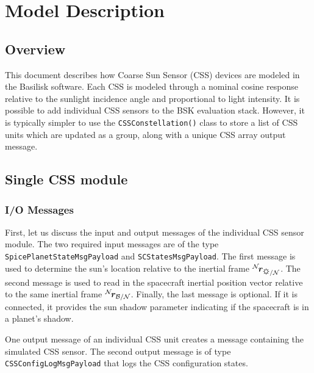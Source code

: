


\section{Model Description}

\subsection{Overview}
This document describes how Coarse Sun Sensor (CSS) devices are modeled in the Basilisk software.  Each CSS is modeled through a nominal cosine response relative to the sunlight incidence angle and proportional to light intensity.  It is possible to add individual CSS sensors to the BSK evaluation stack.  However, it is typically simpler to use the {\tt CSSConstellation()} class to store a list of CSS units which are updated as a group, along with a unique CSS array output message.

\subsection{Single CSS module}
\subsubsection{I/O Messages}
First, let us discuss the input and output messages of the individual CSS sensor module.  The two required input messages are of the type {\tt SpicePlanetStateMsgPayload} and {\tt SCStatesMsgPayload}.  The first message is used to determine the sun's location relative to the inertial frame $\leftexp{N}{\bm r}_{\sun/\mathcal{N}}$.  The second message is used to read in the spacecraft inertial position vector relative to the same inertial frame $\leftexp{N}{\bm r}_{\cal B/N}$.  Finally, the last message is optional.  If it is connected, it provides the sun shadow parameter indicating if the spacecraft is in a planet's shadow.

One output message of an individual CSS unit creates a message containing the simulated CSS sensor.  The second output message is of type {\tt CSSConfigLogMsgPayload} that logs the CSS configuration states.  

